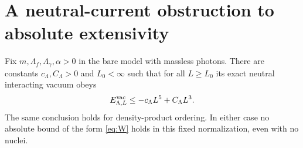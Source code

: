 \section{A neutral-current obstruction to absolute extensivity}
\label{sec:counterexamples}

\begin{theorem}
\label{b-vacuum-L5}
Fix $m,\Lambda_f,\Lambda_\gamma,\alpha>0$ in the bare model with
massless photons. There are constants $c_\Lambda,C_\Lambda>0$ and $L_0<\infty$
such that for all $L\ge L_0$ its exact neutral interacting vacuum obeys
\begin{equation}
 E^{\mathrm{vac}}_{\Lambda,L}\le-c_\Lambda L^5+C_\Lambda L^3.
 \label{eq:vacuum-instability}
\end{equation}
The same conclusion holds for density-product ordering. In either
case no absolute bound of the form \eqref{eq:W} holds in this fixed
normalization, even with no nuclei.
\end{theorem}
